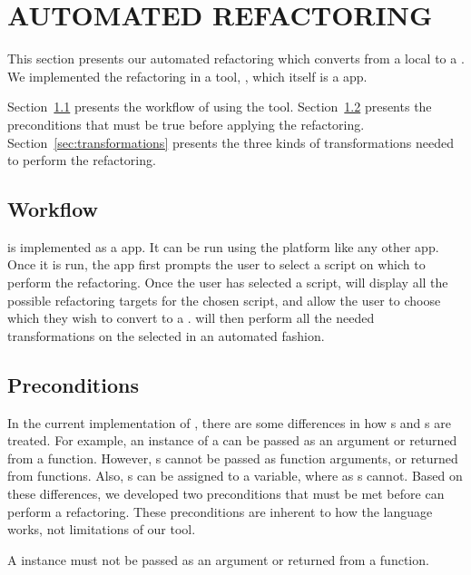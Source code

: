 \documentclass[article]{sigplanconf}
\begin{document}
\section{AUTOMATED REFACTORING}
\label{sec:Refactoring}
This section presents our automated refactoring which converts from a local \NC{} to a . 
We implemented the refactoring in a tool, \tool, which itself is a \TD app.

Section~\ref{sec:workflow} presents the workflow of using the tool. Section~\ref{sec:preconditions} presents the preconditions that must be true
before applying the refactoring. Section~\ref{sec:transformations} presents the three kinds of transformations needed to perform the refactoring.


\subsection{Workflow}
\label{sec:workflow}
\tool is implemented as a \TD app.  It can be run using the \TD platform like any other \TD app.  Once it is run, the app first prompts the user to select a script on which to perform the refactoring.  Once the user has selected a script, \tool will display all the possible refactoring targets for the chosen script, and allow the user to choose which \NC they wish to convert to a \CDT. \tool will then perform all the needed transformations on the selected \NC in an automated fashion.  

\subsection{Preconditions}
\label{sec:preconditions}
In the current implementation of \TD, there are some differences in how \NC{}s and \CDT{}s are treated.
For example, an instance of a \NC{} can be passed as an argument or returned from a \TD function.  However, \CDT{}s cannot be passed as function arguments, or returned from functions.  Also, \NC{}s can be assigned to a variable, where as \CDT{}s cannot.  Based on these differences, we developed two preconditions that must be met before \tool can perform a refactoring.  These preconditions are inherent to how the \TD language works, not limitations of our tool.   

\POne  A \NC{} instance must not be passed as an argument or returned from a function. 
\end{document}
